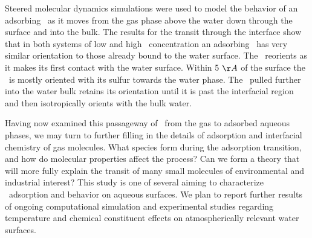 Steered molecular dynamics simulations were used to model the behavior of an adsorbing \suldiox~as it moves from the gas phase above the water down through the surface and into the bulk. The results for the transit through the interface show that in both systems of low and high \suldiox~concentration an adsorbing \suldiox~has very similar orientation to those already bound to the water surface. The \suldiox~reorients as it makes its first contact with the water surface. Within 5 $\AA$ of the surface the \suldiox~is mostly oriented with its sulfur towards the water phase. The \suldiox~pulled further into the water bulk retains its orientation until it is past the interfacial region and then isotropically orients with the bulk water.

Having now examined this passageway of \suldiox~from the gas to adsorbed aqueous phases, we may turn to further filling in the details of adsorption and interfacial chemistry of gas molecules. What species form during the adsorption transition, and how do molecular properties affect the process? Can we form a theory that will more fully explain the transit of many small molecules of environmental and industrial interest? This study is one of several aiming to characterize \suldiox~adsorption and behavior on aqueous surfaces. We plan to report further results of ongoing computational simulation and experimental studies regarding temperature and chemical constituent effects on atmospherically relevant water surfaces.
